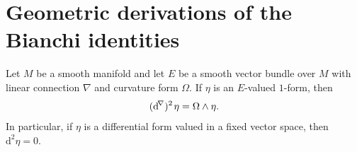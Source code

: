 \section{Geometric derivations of the Bianchi identities}

\begin{theorem}
  Let $M$ be a smooth manifold and let $E$ be a smooth vector bundle over $M$ with linear connection $\nabla$ and curvature form $\Omega$. If $\eta$ is an $E$-valued $1$-form, then
  \begin{equation}
    (\mathrm{d}^{\mskip -3mu \nabla})^2 \mskip 2mu \eta = \Omega \wedge \eta.
  \end{equation}
  In particular, if $\eta$ is a differential form valued in a fixed vector space, then $\mathrm{d}^2 \eta = 0$.
\end{theorem}
